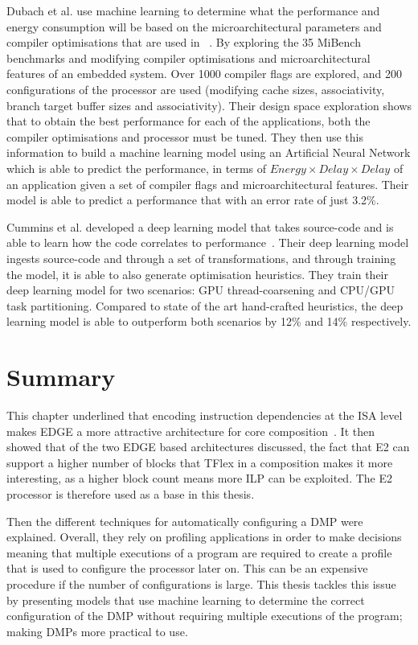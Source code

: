 Dubach et al. use machine learning to determine what the performance and energy consumption will be based on the microarchitectural parameters and compiler optimisations that are used in ~\cite{DubachExpl2012}.
By exploring the 35 MiBench benchmarks and modifying compiler optimisations and microarchitectural features of an embedded system.
Over 1000 compiler flags are explored, and 200 configurations of the processor are used (modifying cache sizes, associativity, branch target buffer sizes and associativity).
Their design space exploration shows that to obtain the best performance for each of the applications, both the compiler optimisations and processor must be tuned.
They then use this information to build a machine learning model using an Artificial Neural Network which is able to predict the performance, in terms of $Energy \times Delay \times Delay$ of an application given a set of compiler flags and microarchitectural features.
Their model is able to predict a performance that with an error rate of just 3.2\%.

Cummins et al. developed a deep learning model that takes source-code and is able to learn how the code correlates to performance~\cite{cummins2017pact}.
Their deep learning model ingests source-code and through a set of transformations, and through training the model, it is able to also generate optimisation heuristics.
They train their deep learning model for two scenarios: GPU thread-coarsening and CPU/GPU task partitioning.
Compared to state of the art hand-crafted heuristics, the deep learning model is able to outperform both scenarios by 12\% and 14\% respectively.
\vspace{-1.5em}
\section{Summary}
This chapter underlined that encoding instruction dependencies at the ISA level makes EDGE a more attractive architecture for core composition~\cite{kim2007tflex}.
It then showed that of the two EDGE based architectures discussed, the fact that E2 can support a higher number of blocks that TFlex in a composition makes it more interesting, as a higher block count means more ILP can be exploited.
The E2 processor is therefore used as a base in this thesis.

Then the different techniques for automatically configuring a DMP were explained.
Overall, they rely on profiling applications in order to make decisions meaning that multiple executions of a program are required to create a profile that is used to configure the processor later on.
This can be an expensive procedure if the number of configurations is large.
This thesis tackles this issue by presenting models that use machine learning to determine the correct configuration of the DMP without requiring multiple executions of the program; making DMPs more practical to use.

